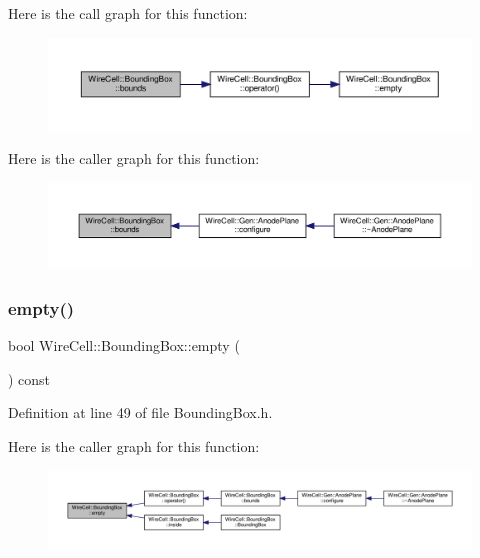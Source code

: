 Here is the call graph for this function\+:
\nopagebreak
\begin{figure}[H]
\begin{center}
\leavevmode
\includegraphics[width=350pt]{class_wire_cell_1_1_bounding_box_a3a0816d852fb478e057496a0409e0c72_cgraph}
\end{center}
\end{figure}
Here is the caller graph for this function\+:
\nopagebreak
\begin{figure}[H]
\begin{center}
\leavevmode
\includegraphics[width=350pt]{class_wire_cell_1_1_bounding_box_a3a0816d852fb478e057496a0409e0c72_icgraph}
\end{center}
\end{figure}
\mbox{\label{class_wire_cell_1_1_bounding_box_a142836bb402b1c40c0dd19dd4c88a548}} 
\subsubsection{\texorpdfstring{empty()}{empty()}}
{\footnotesize\ttfamily bool Wire\+Cell\+::\+Bounding\+Box\+::empty (\begin{DoxyParamCaption}{ }\end{DoxyParamCaption}) const\hspace{0.3cm}{\ttfamily [inline]}}



Definition at line 49 of file Bounding\+Box.\+h.

Here is the caller graph for this function\+:
\nopagebreak
\begin{figure}[H]
\begin{center}
\leavevmode
\includegraphics[width=350pt]{class_wire_cell_1_1_bounding_box_a142836bb402b1c40c0dd19dd4c88a548_icgraph}
\end{center}
\end{figure}
\mbox{\label{class_wire_cell_1_1_bounding_box_a5d0ef4e3335f0aaf0a4a8fa577914539}} 
